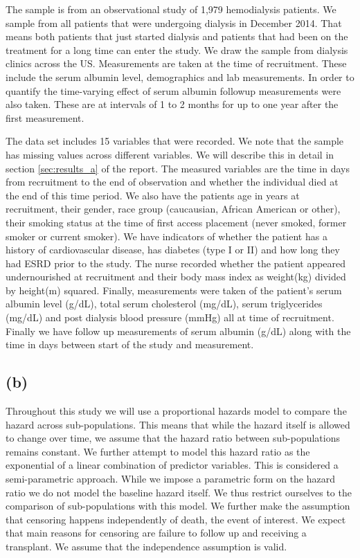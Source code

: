 \documentclass[paper=a4, fontsize=11pt]{scrartcl} %
\numberwithin{equation}{section} %
\numberwithin{figure}{section} %
\numberwithin{table}{section} %
\begin{document}
The sample is from an observational study of 1,979 hemodialysis patients. We sample from all patients that were undergoing dialysis in December 2014. That means both patients that just started dialysis and patients that had been on the treatment for a long time can enter the study. We draw the sample from dialysis clinics across the US. Measurements are taken at the time of recruitment. These include the serum albumin level, demographics and lab measurements. In order to quantify the time-varying effect of serum albumin followup measurements were also taken. These are at intervals of 1 to 2 months for up to one year after the first measurement.

The data set includes 15 variables that were recorded. We note that the sample has missing values across different variables. We will describe this in detail in section \ref{sec:results_a} of the report. The measured variables are the time in days from recruitment to the end of observation and whether the individual died at the end of this time period. We also have the patients age in years at recruitment, their gender, race group (caucausian, African American or other), their smoking status at the time of first access placement (never smoked, former smoker or current smoker). We have indicators of whether the patient has a history of cardiovascular disease, has diabetes (type I or II) and how long they had ESRD prior to the study. The nurse recorded whether the patient appeared undernourished at recruitment and their body mass index as weight(kg) divided by height(m) squared. Finally, measurements were taken of the patient's serum albumin level (g/dL), total serum cholesterol (mg/dL), serum triglycerides (mg/dL) and post dialysis blood pressure (mmHg) all at time of recruitment. Finally we have follow up measurements of serum albumin (g/dL) along with the time in days between start of the study and measurement.



\subsection{(b)}
\label{sec:methods_b}

Throughout this study we will use a proportional hazards model to compare the hazard across sub-populations. This means that while the hazard itself is allowed to change over time, we assume that the hazard ratio between sub-populations remains constant. We further attempt to model this hazard ratio as the exponential of a linear combination of predictor variables. This is considered a semi-parametric approach. While we impose a parametric form on the hazard ratio we do not model the baseline hazard itself. We thus restrict ourselves to the comparison of sub-populations with this model. We further make the assumption that censoring happens independently of death, the event of interest.
We expect that main reasons for censoring are failure to follow up and receiving a transplant. We assume that the independence assumption is valid.\\
\end{document}
